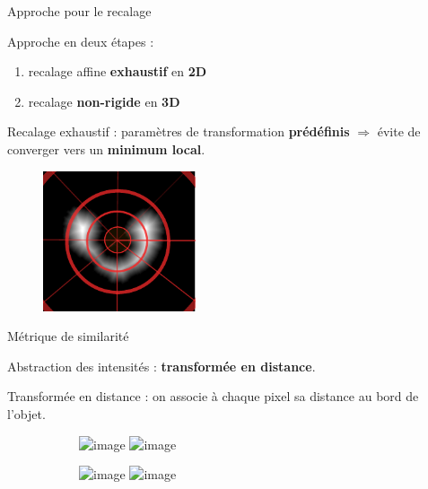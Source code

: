 \documentclass[10pt]{beamer}
\begin{document}
\begin{frame}{Approche pour le recalage}
  
  Approche en deux étapes :
  \begin{enumerate}
  \item recalage affine \textbf{exhaustif} en \textbf{2D}
  \item recalage \textbf{non-rigide} en \textbf{3D}
  \end{enumerate}

  \alert{Recalage exhaustif} : paramètres de transformation \textbf{prédéfinis} $\Rightarrow$ évite de converger vers un \textbf{minimum local}.

  \begin{figure}[ht]
    \centering
    \includegraphics[width=0.4\textwidth]{fig/exhaustive_registration}
    \caption{}
    \label{fig:exhaustive_registration}
  \end{figure}

  
\end{frame}

\begin{frame}{Métrique de similarité}

  Abstraction des intensités : \textbf{transformée en distance}.

  \alert{Transformée en distance} : on associe à chaque pixel sa distance au bord de l'objet.

  \begin{figure}[ht]
    \centering
    \begin{subfigure}[t]{0.5\textwidth}
      \centering
      \includegraphics<1>[width=0.65\textwidth]{fig/mri_slice6.png}%
      \includegraphics<2>[width=0.65\textwidth]{fig/mri_slice6_dt.png}
      \caption{}
      \label{subfig:mri_slice6_dt.png}
    \end{subfigure}%
    \begin{subfigure}[t]{0.5\textwidth}
      \centering
      \includegraphics<1>[width=0.65\textwidth]{fig/maldi_slice6.png}%
      \includegraphics<2>[width=0.65\textwidth]{fig/maldi_slice6_dt.png}
      \caption{}
      \label{subfig:maldi_slice6_dt.png}
    \end{subfigure}%
  \end{figure}

  
\end{frame}
\end{document}
